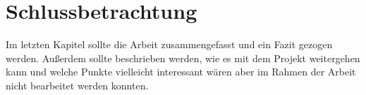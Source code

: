 \chapter{Schlussbetrachtung}
Im letzten Kapitel sollte die Arbeit zusammengefasst und ein Fazit gezogen werden. Außerdem sollte beschrieben werden, wie es mit dem Projekt weitergehen kann und welche Punkte vielleicht interessant wären aber im Rahmen der Arbeit nicht bearbeitet werden konnten.